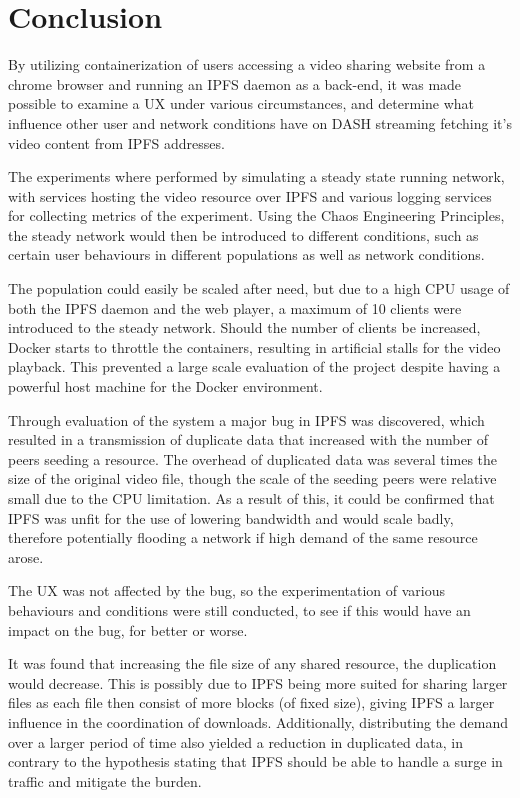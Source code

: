 \chapter{Conclusion}
\label{cha:conclusion}

By utilizing containerization of users accessing a video sharing website from a chrome browser and running an \ac{IPFS} daemon as a back-end, it was made possible to examine a \ac{UX} under various circumstances, and determine what influence other user and network conditions have on \ac{DASH} streaming fetching it's video content from \ac{IPFS} addresses.

The experiments where performed by simulating a steady state running network, with services hosting the video resource over \ac{IPFS} and various logging services for collecting metrics of the experiment.
Using the Chaos Engineering Principles, the steady network would then be introduced to different conditions, such as certain user behaviours in different populations as well as network conditions.

The population could easily be scaled after need, but due to a high \ac{CPU} usage of both the \ac{IPFS} daemon and the web player, a maximum of 10 clients were introduced to the steady network. Should the number of clients be increased, Docker starts to throttle the containers, resulting in artificial stalls for the video playback. This prevented a large scale evaluation of the project despite having a powerful host machine for the Docker environment.

Through evaluation of the system a major bug in \ac{IPFS} was discovered, which resulted in a transmission of duplicate data that increased with the number of peers seeding a resource. The overhead of duplicated data was several times the size of the original video file, though the scale of the seeding peers were relative small due to the \ac{CPU} limitation. As a result of this, it could be confirmed that \ac{IPFS} was unfit for the use of lowering bandwidth and would scale badly, therefore potentially flooding a network if high demand of the same resource arose.

The \ac{UX} was not affected by the bug, so the experimentation of various behaviours and conditions were still conducted, to see if this would have an impact on the bug, for better or worse.

It was found that increasing the file size of any shared resource, the duplication would decrease. This is possibly due to \ac{IPFS} being more suited for sharing larger files as each file then consist of more blocks (of fixed size), giving \ac{IPFS} a larger influence in the coordination of downloads. Additionally, distributing the demand over a larger period of time also yielded a reduction in duplicated data, in contrary to the hypothesis stating that \ac{IPFS} should be able to handle a surge in traffic and mitigate the burden.

